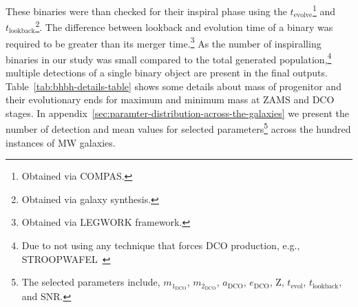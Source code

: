 \documentclass[journal, twocolumn]{IEEEtran}
\newcommand{\mone}[1]{m_{1_{\text{#1}}}}
\newcommand{\mtwo}[1]{m_{2_{\text{#1}}}}
\newcommand{\semaxis}[1]{a_{\text{#1}}}
\newcommand{\ecc}[1]{e_\text{#1}}
\newcommand{\interval}[1]{t_\text{#1}}
\begin{document}
    These binaries were than checked for their inspiral phase using the $\interval{evolve}$\footnote{Obtained via COMPAS.} and $\interval{lookback}$\footnote{Obtained via galaxy synthesis.}.
    The difference between lookback and evolution time of a binary was required to be greater than its merger time.\footnote{Obtained via LEGWORK framework.}
    As the number of inspiralling binaries in our study was small compared to the total generated population,\footnote{Due to not using any technique that forces DCO production, e.g., STROOPWAFEL~\cite{Broekgaarden2019}} multiple detections of a single binary object are present in the final outputs.
    Table~\ref{tab:bhbh-details-table} shows some details about mass of progenitor and their evolutionary ends for maximum and minimum mass at ZAMS and DCO stages. In appendix~\ref{sec:paramter-distribution-across-the-galaxies} we present the number of detection and mean values for selected parameters\footnote{The selected  parameters include, $\mone{DCO}$, $\mtwo{DCO}$, $\semaxis{DCO}$, $\ecc{DCO}$, Z, $\interval{evol}$, $\interval{lookback}$, and SNR.} across the hundred instances of MW galaxies.
    
\end{document}
